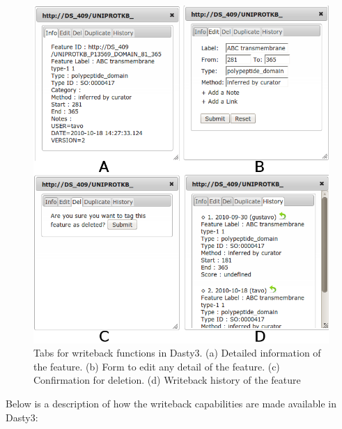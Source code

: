 \begin{figure}[p]
\centering
\includegraphics[width=6in]{figures/tabsD3.png} 
\caption [Tabs for writeback functions in Dasty3] {Tabs for writeback functions in Dasty3. (a) Detailed information of the feature. (b) Form to edit any detail of the feature. (c) Confirmation for deletion. (d) Writeback history of the feature }  \label{fig: dastywb3}
\end{figure}
	
Below is a description of how the writeback capabilities are made available in Dasty3:

